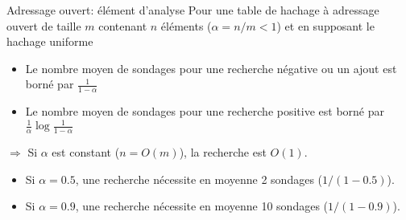 \begin{frame}{Adressage ouvert: élément d'analyse}
Pour une table de hachage à adressage ouvert de taille $m$ contenant $n$ éléments ($\alpha=n/m<1$) et en supposant le hachage uniforme
\begin{itemize}
\item Le nombre moyen de sondages pour une recherche négative ou un
  ajout est borné par $\frac{1}{1-\alpha}$
\item Le nombre moyen de sondages pour une recherche positive est borné par $\frac{1}{\alpha} \log \frac{1}{1-\alpha}$
\end{itemize}

\bigskip

$\Rightarrow$ Si $\alpha$ est constant ($n=O(m)$), la recherche est $O(1)$.
\begin{itemize}
\item Si $\alpha=0.5$, une recherche nécessite en moyenne 2 sondages ($1/(1-0.5)$).
\item Si $\alpha=0.9$, une recherche nécessite en moyenne 10 sondages ($1/(1-0.9)$).
\end{itemize}


\end{frame}

